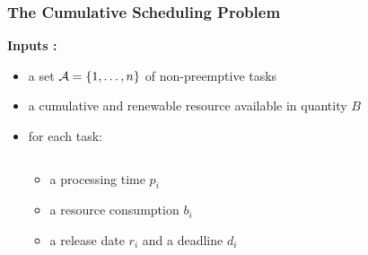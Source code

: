 \begin{frame}
  \frametitle{The Cumulative Scheduling Problem} 
\vspace{0.1cm}
 \textbf{Inputs : }
\vspace{0.15cm}
  \begin{itemize}
  \item a set ${\cal A}=\{1,\dots ,n\}$ of non-preemptive tasks
\vspace{0.15cm}
    \item a cumulative and renewable resource available in quantity $B$
\vspace{0.15cm}
    \item<2-> for each task:
      \vspace{-1cm}
      \begin{columns}
        \hfill
        \begin{column}{0.36\linewidth}
          \begin{itemize}
          \item<2-> \footnotesize  a processing time $p_i$
          \item<3-> \footnotesize a resource consumption $b_i$ 
          \item<4-> \footnotesize a release date $r_i$ and a deadline $d_i$ 
          \end{itemize}
        \end{column}
        \begin{column}{0.7\linewidth}
          \centering
          
      \end{column} 
    \end{columns}
  \end{itemize}
\vspace{-0.5cm}
\end{frame}


  

